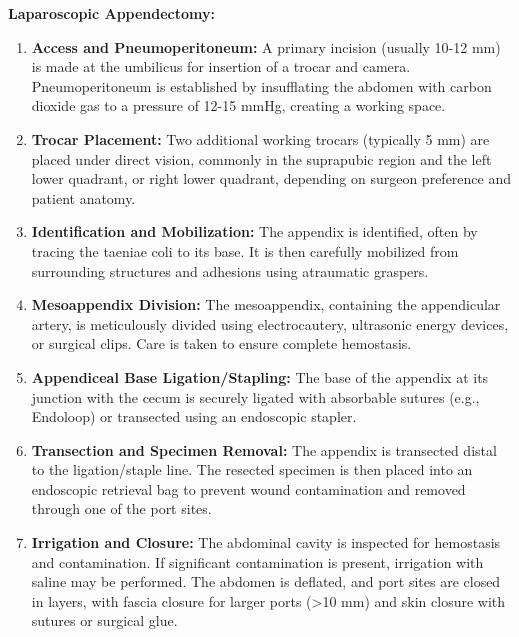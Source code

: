 \textbf{Laparoscopic Appendectomy:}
\begin{enumerate}
  \item \textbf{Access and Pneumoperitoneum:} A primary incision (usually 10-12 mm) is made at the umbilicus for insertion of a trocar and camera. Pneumoperitoneum is established by insufflating the abdomen with carbon dioxide gas to a pressure of 12-15 mmHg, creating a working space.
  \item \textbf{Trocar Placement:} Two additional working trocars (typically 5 mm) are placed under direct vision, commonly in the suprapubic region and the left lower quadrant, or right lower quadrant, depending on surgeon preference and patient anatomy.
  \item \textbf{Identification and Mobilization:} The appendix is identified, often by tracing the taeniae coli to its base. It is then carefully mobilized from surrounding structures and adhesions using atraumatic graspers.
  \item \textbf{Mesoappendix Division:} The mesoappendix, containing the appendicular artery, is meticulously divided using electrocautery, ultrasonic energy devices, or surgical clips. Care is taken to ensure complete hemostasis.
  \item \textbf{Appendiceal Base Ligation/Stapling:} The base of the appendix at its junction with the cecum is securely ligated with absorbable sutures (e.g., Endoloop) or transected using an endoscopic stapler.
  \item \textbf{Transection and Specimen Removal:} The appendix is transected distal to the ligation/staple line. The resected specimen is then placed into an endoscopic retrieval bag to prevent wound contamination and removed through one of the port sites.
  \item \textbf{Irrigation and Closure:} The abdominal cavity is inspected for hemostasis and contamination. If significant contamination is present, irrigation with saline may be performed. The abdomen is deflated, and port sites are closed in layers, with fascia closure for larger ports (>10 mm) and skin closure with sutures or surgical glue.
\end{enumerate}

